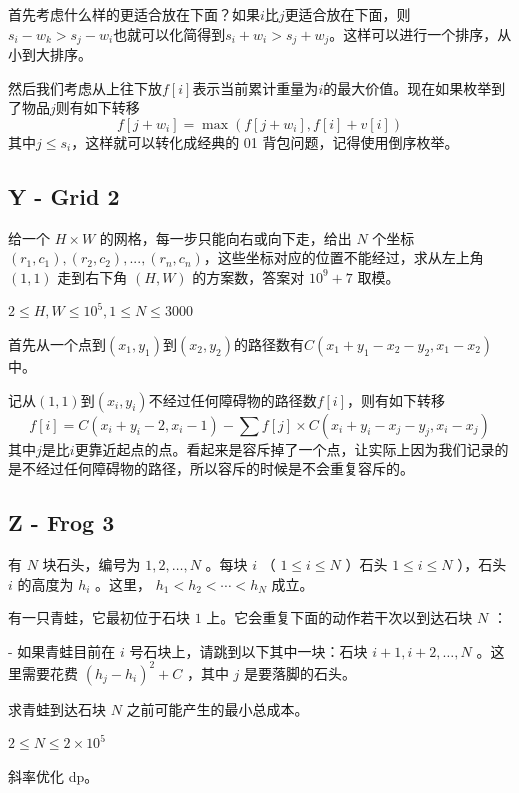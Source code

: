 首先考虑什么样的更适合放在下面？如果$i$比$j$更适合放在下面，则$s_i-w_k> s_j-w_i$也就可以化简得到$s_i+w_i > s_j + w_j$。这样可以进行一个排序，从小到大排序。

然后我们考虑从上往下放$f[i]$表示当前累计重量为$i$的最大价值。现在如果枚举到了物品$j$则有如下转移
\[
    f[j+w_i] = \max( f[j+w_i] , f[i] + v[i] )
\]
其中$j\le s_i$，这样就可以转化成经典的 01 背包问题，记得使用倒序枚举。


\subsection{Y - Grid 2}
\begin{framed}
    给一个 $H\times W$ 的网格，每一步只能向右或向下走，给出 $N$ 个坐标 $(r_1,c_1),(r_2,c_2),...,(r_n,c_n)$，这些坐标对应的位置不能经过，求从左上角 $(1,1)$ 走到右下角 $(H,W)$ 的方案数，答案对 $10^9+7$ 取模。

    $2 \leq H, W \leq 10^5 ,1 \leq N \leq 3000$
\end{framed}
首先从一个点到$(x_1,y_1)$到$(x_2,y_2)$的路径数有$C(x_1 + y_1 - x_2 - y_2 , x_1 - x_2)$中。

记从$(1,1)$到$(x_i,y_i)$不经过任何障碍物的路径数$f[i]$，则有如下转移
\[
    f[i] = C(x_i + y_i - 2 , x_i - 1 ) - \sum f[j] \times C( x_i + y_i - x_j - y_j , x_i - x_j)
\]
其中$j$是比$i$更靠近起点的点。看起来是容斥掉了一个点，让实际上因为我们记录的是不经过任何障碍物的路径，所以容斥的时候是不会重复容斥的。


\subsection{Z - Frog 3}
\begin{framed}
    有 $N$ 块石头，编号为 $1, 2, \ldots, N$ 。每块 $i$ （ $1 \leq i \leq N$ ）石头 $1 \leq i \leq N$ ），石头 $i$ 的高度为 $h_i$ 。这里， $h_1 \lt h_2 \lt \cdots \lt h_N$ 成立。

    有一只青蛙，它最初位于石块 $1$ 上。它会重复下面的动作若干次以到达石块 $N$ ：

    - 如果青蛙目前在 $i$ 号石块上，请跳到以下其中一块：石块 $i + 1, i + 2, \ldots, N$ 。这里需要花费 $(h_j - h_i)^2 + C$ ，其中 $j$ 是要落脚的石头。

    求青蛙到达石块 $N$ 之前可能产生的最小总成本。

    $2 \leq N \leq 2 \times 10^5$
\end{framed}
斜率优化 dp。

